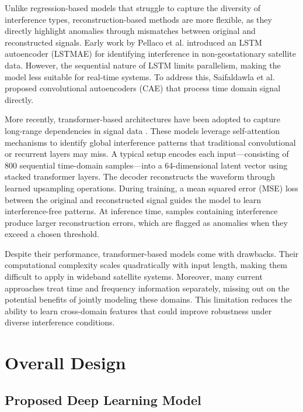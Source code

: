 \documentclass[conference]{IEEEtran}
\begin{document}
Unlike regression-based models that struggle to capture the diversity of interference types, reconstruction-based methods are more flexible, as they directly highlight anomalies through mismatches between original and reconstructed signals. Early work by Pellaco et al. \cite{pellacoSpectrumPredictionInterference2019} introduced an LSTM autoencoder (LSTMAE) for identifying interference in non-geostationary satellite data. However, the sequential nature of LSTM limits parallelism, making the model less suitable for real-time systems. To address this, Saifaldawla et al. \cite{saifaldawlaConvolutionalAutoencodersNonGeostationary2024} proposed convolutional autoencoders (CAE) that process time domain signal directly.

More recently, transformer-based architectures have been adopted to capture long-range dependencies in signal data \cite{saifaldawlaGenAIBasedModelsNGSO2024}. These models leverage self-attention mechanisms to identify global interference patterns that traditional convolutional or recurrent layers may miss. A typical setup encodes each input—consisting of 800 sequential time-domain samples—into a 64-dimensional latent vector using stacked transformer layers. The decoder reconstructs the waveform through learned upsampling operations. During training, a mean squared error (MSE) loss between the original and reconstructed signal guides the model to learn interference-free patterns. At inference time, samples containing interference produce larger reconstruction errors, which are flagged as anomalies when they exceed a chosen threshold.

Despite their performance, transformer-based models come with drawbacks. Their computational complexity scales quadratically with input length, making them difficult to apply in wideband satellite systems. Moreover, many current approaches treat time and frequency information separately, missing out on the potential benefits of jointly modeling these domains. This limitation reduces the ability to learn cross-domain features that could improve robustness under diverse interference conditions.

\section{Overall Design}
\label{sec:model}

\subsection{Proposed Deep Learning Model}
\label{subsec:proposed_model}
\end{document}
